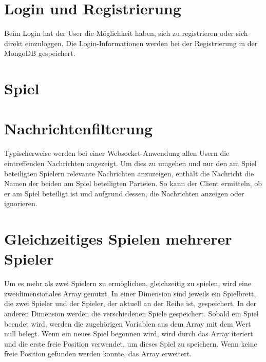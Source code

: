 \section{Login und Registrierung}\label{sec:Login}
Beim Login hat der User die Möglichkeit haben, sich zu registrieren oder sich direkt einzuloggen. Die Login-Informationen werden bei der Registrierung in der MongoDB gespeichert. 

\section{Spiel}\label{sec:Spiel}

\section{Nachrichtenfilterung}\label{sec:Nachrichtenfilter}
Typischerweise werden bei einer Websocket-Anwendung allen Usern die eintreffenden Nachrichten angezeigt. Um dies zu umgehen und nur den am Spiel beteiligten Spielern relevante Nachrichten anzuzeigen, enthält die Nachricht die Namen der beiden am Spiel beteiligten Parteien. So kann der Client ermitteln, ob er am Spiel beteiligt ist und aufgrund dessen, die Nachrichten anzeigen oder ignorieren. 

\section{Gleichzeitiges Spielen mehrerer Spieler}\label{sec:Multiplegames}
Um es mehr als zwei Spielern zu ermöglichen, gleichzeitig zu spielen, wird eine zweidimensionales Array genutzt. In einer Dimension sind jeweils ein Spielbrett, die zwei Spieler und der Spieler, der aktuell an der Reihe ist, gespeichert. In der anderen Dimension werden die verschiedenen Spiele gespeichert. Sobald ein Spiel beendet wird, werden die zugehörigen Variablen aus dem Array mit dem Wert null belegt. Wenn ein neues Spiel begonnen wird, wird durch das Array iteriert und die erste freie Position verwendet, um dieses Spiel zu speichern. Wenn keine freie Position gefunden werden konnte, das Array erweitert. 

